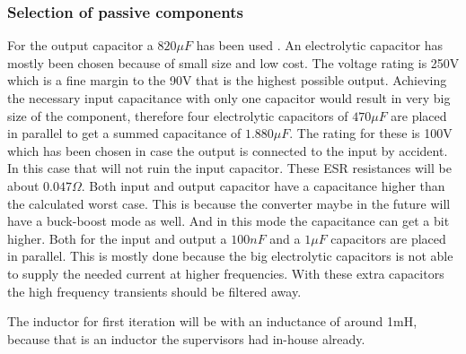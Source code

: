 \subsubsection{Selection of passive components}
For the output capacitor a $820\mu F$ has been used \cite{cout}. An electrolytic capacitor has mostly been chosen because of small size and low cost. The voltage rating is 250V which is a fine margin to the 90V that is the highest possible output.  
Achieving the necessary input capacitance with only one capacitor would result in very big size of the component, therefore four electrolytic capacitors of $470\mu F$ \cite{cin} are placed in parallel to get a summed capacitance of $1.880\mu F$. The rating for these is 100V which has been chosen in case the output is connected to the input by accident. In this case that will not ruin the input capacitor. These ESR resistances will be about $0.047\Omega$. Both input and output capacitor have a capacitance higher than the calculated worst case. This is because the converter maybe in the future will have a buck-boost mode as well. And in this mode the capacitance can get a bit higher. 
Both for the input and output a $100nF$ and a $1\mu F$ capacitors are placed in parallel. This is mostly done because the big electrolytic capacitors is not able to supply the needed current at higher frequencies. With these extra capacitors the high frequency transients should be filtered away.

The inductor for first iteration  will be with an inductance of around 1mH,  because that is an inductor the supervisors had in-house already.